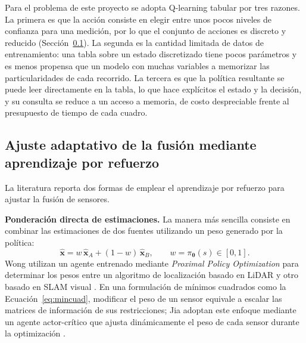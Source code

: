 Para el problema de este proyecto se adopta Q-learning tabular por tres razones.
La primera es que la acción consiste en elegir entre unos pocos niveles de confianza para una medición, por lo que el conjunto de acciones es discreto y reducido (Sección~\ref{sec:rl-fusion}).
La segunda es la cantidad limitada de datos de entrenamiento: una tabla sobre un estado discretizado tiene pocos parámetros y es menos propensa que un modelo con muchas variables a memorizar las particularidades de cada recorrido.
La tercera es que la política resultante se puede leer directamente en la tabla, lo que hace explícitos el estado y la decisión, y su consulta se reduce a un acceso a memoria, de costo despreciable frente al presupuesto de tiempo de cada cuadro.

\subsection{Ajuste adaptativo de la fusión mediante aprendizaje por refuerzo}
\label{sec:rl-fusion}

La literatura reporta dos formas de emplear el aprendizaje por refuerzo para ajustar la fusión de sensores.

\textbf{Ponderación directa de estimaciones.}
La manera más sencilla consiste en combinar las estimaciones de dos fuentes utilizando un peso generado por la política:
\begin{equation}
\hat{\mathbf{x}} = w\,\hat{\mathbf{x}}_{A} + (1-w)\,\hat{\mathbf{x}}_{B},
\qquad
w = \pi_{\boldsymbol{\theta}}(s) \in [0,1].
\label{eq:ponderacion-directa}
\end{equation}
Wong \etal{} utilizan un agente entrenado mediante \textit{Proximal Policy Optimization} para determinar los pesos entre un algoritmo de localización basado en LiDAR y otro basado en SLAM visual \cite{wong2024drlslam}.
En una formulación de mínimos cuadrados como la Ecuación~\eqref{eq:mincuad}, modificar el peso de un sensor equivale a escalar las matrices de información de sus restricciones; Jia \etal{} adoptan este enfoque mediante un agente actor-crítico que ajusta dinámicamente el peso de cada sensor durante la optimización \cite{jia2021lviofusion}.

